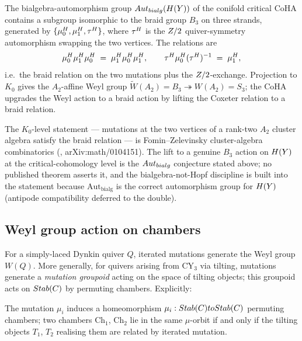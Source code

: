 \begin{conjecture}
  \label{conj:braid-b3-conifold}
  \ClaimStatusConjectured
  The bialgebra-automorphism group $Aut_{bialg}(H(Y))$
  of the conifold critical CoHA contains a subgroup isomorphic to the
  braid group $B_3$ on three strands, generated by
  $\{\mu_0^{H}, \mu_1^{H}, \tau^{H}\}$, where $\tau^{H}$ is the $Z/2$
  quiver-symmetry automorphism swapping the two vertices. The
  relations are
  \[
    \mu_0^{H} \mu_1^{H} \mu_0^{H} \;=\; \mu_1^{H} \mu_0^{H} \mu_1^{H},
    \qquad
    \tau^{H} \mu_0^{H} (\tau^{H})^{-1} \;=\; \mu_1^{H},
  \]
  i.e.\ the braid relation on the two mutations plus the $Z/2$-exchange.
  Projection to $K_0$ gives the $A_2$-affine Weyl group
  $\widetilde{W}(A_2) = B_3 \twoheadrightarrow W(A_2) = S_3$; the CoHA
  upgrades the Weyl action to a braid action by lifting the Coxeter
  relation to a braid relation.
\end{conjecture}

\begin{remark}
  The $K_0$-level statement --- mutations at the two vertices of a
  rank-two $A_2$ cluster algebra satisfy the braid relation --- is
  Fomin--Zelevinsky cluster-algebra combinatorics
  (\cite[Thm 1.9]{FominZelevinsky2002}, arXiv:math/0104151). The lift
  to a genuine $B_3$ action on $H(Y)$ at the critical-cohomology
  level is the $Aut_{bialg}$ conjecture stated above; no
  published theorem asserts it, and the bialgebra-not-Hopf discipline
  is built into the statement because $\mathrm{Aut}_{\mathrm{bialg}}$
  is the correct automorphism group for $H(Y)$ (antipode
  compatibility deferred to the double).
\end{remark}

\subsection{Weyl group action on chambers}

For a simply-laced Dynkin quiver $Q$, iterated mutations generate the Weyl
group $W(Q)$. More generally, for quivers arising from CY$_3$ via tilting,
mutations generate a \emph{mutation groupoid} acting on the space of
tilting objects; this groupoid acts on $Stab(C)$ by permuting chambers.
Explicitly:

\begin{proposition}
  \label{prop:mutation-on-chambers}
  The mutation $\mu_i$ induces a homeomorphism $\mu_i : Stab(C) to Stab(C)$
  permuting chambers; two chambers $\mathrm{Ch}_1$, $\mathrm{Ch}_2$ lie in the same
  $\mu$-orbit if and only if the tilting objects $T_1$, $T_2$ realising them
  are related by iterated mutation.
\end{proposition}

